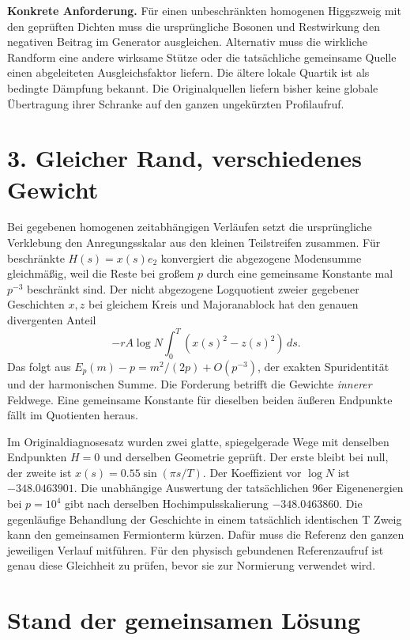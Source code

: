 \documentclass[11pt,a4paper]{article}
\newcommand{\panel}[1]{\noindent\colorbox{pale}{\parbox{\dimexpr\linewidth-2\fboxsep}{\vspace{4pt}\color{ink}#1\vspace{4pt}}}}
\begin{document}
\panel{\textbf{Konkrete Anforderung.} Für einen unbeschränkten homogenen Higgszweig mit den geprüften Dichten muss die ursprüngliche Bosonen und Restwirkung den negativen Beitrag im Generator ausgleichen. Alternativ muss die wirkliche Randform eine andere wirksame Stütze oder die tatsächliche gemeinsame Quelle einen abgeleiteten Ausgleichsfaktor liefern. Die ältere lokale Quartik ist als bedingte Dämpfung bekannt. Die Originalquellen liefern bisher keine globale Übertragung ihrer Schranke auf den ganzen ungekürzten Profilaufruf.}

\clearpage
\section*{3. Gleicher Rand, verschiedenes Gewicht}

Bei gegebenen homogenen zeitabhängigen Verläufen setzt die ursprüngliche Verklebung den Anregungsskalar aus den kleinen Teilstreifen zusammen. Für beschränkte \(H(s)=x(s)e_2\) konvergiert die abgezogene Modensumme gleichmäßig, weil die Reste bei großem \(p\) durch eine gemeinsame Konstante mal \(p^{-3}\) beschränkt sind. Der nicht abgezogene Logquotient zweier gegebener Geschichten \(x,z\) bei gleichem Kreis und Majoranablock hat den genauen divergenten Anteil
\[
 -r A \log N\int_0^T (x(s)^2-z(s)^2)\,ds .
\]
Das folgt aus \(E_p(m)-p=m^2/(2p)+O(p^{-3})\), der exakten Spuridentität und der harmonischen Summe. Die Forderung betrifft die Gewichte \emph{innerer} Feldwege. Eine gemeinsame Konstante für dieselben beiden äußeren Endpunkte fällt im Quotienten heraus.

Im Originaldiagnosesatz wurden zwei glatte, spiegelgerade Wege mit denselben Endpunkten \(H=0\) und derselben Geometrie geprüft. Der erste bleibt bei null, der zweite ist \(x(s)=0.55\sin(\pi s/T)\). Der Koeffizient vor \(\log N\) ist \(-348.0463901\). Die unabhängige Auswertung der tatsächlichen 96er Eigenenergien bei \(p=10^4\) gibt nach derselben Hochimpulsskalierung \(-348.0463860\). Die gegenläufige Behandlung der Geschichte in einem tatsächlich identischen T Zweig kann den gemeinsamen Fermionterm kürzen. Dafür muss die Referenz den ganzen jeweiligen Verlauf mitführen. Für den physisch gebundenen Referenzaufruf ist genau diese Gleichheit zu prüfen, bevor sie zur Normierung verwendet wird.

\section*{Stand der gemeinsamen Lösung}
\end{document}
